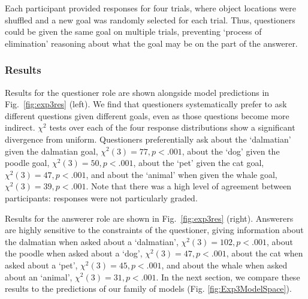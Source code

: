 \documentclass[12pt, floatsintext, man]{apa6}
\begin{document}
Each participant provided responses for four trials, where object locations were shuffled and a new goal was randomly selected for each trial. Thus, questioners could be given the same goal on multiple trials, preventing `process of elimination' reasoning about what the goal may be on the part of the answerer. 

\subsubsection{Results}
Results for the questioner role are shown alongside model predictions in Fig.~\ref{fig:exp3res} (left). We find that questioners systematically prefer to ask different questions given different goals, even as those questions become more indirect. $\chi^2$ tests over each of the four response distributions show a significant divergence from uniform. Questioners preferentially ask about the `dalmatian' given the  dalmatian goal, ${\chi^2(3) = 77}, {p < .001}$, about the `dog' given the poodle goal, ${\chi^2(3) = 50}, {p <.001}$, about the `pet' given the cat goal, ${\chi^2(3) = 47},  {p <.001}$, and about the `animal' when given the whale goal, ${\chi^2(3) = 39}, {p <.001}$. Note that there was a high level of agreement between participants: responses were not particularly graded.

Results for the answerer role are shown in Fig.~\ref{fig:exp3res} (right). Answerers are highly sensitive to the constraints of the questioner, giving information about the dalmatian when asked about a `dalmatian', ${\chi^2(3) = 102}, {p <.001}$, about the poodle when asked about a `dog', ${\chi^2(3) = 47}, {p <.001}$, about the cat when asked about a `pet', ${\chi^2(3) = 45}, {p<.001}$, and about the whale when asked about an `animal', ${\chi^2(3) = 31}, {p < .001}$. In the next section, we compare these results to the predictions of our family of models (Fig. \ref{fig:Exp3ModelSpace}). 
\end{document}
